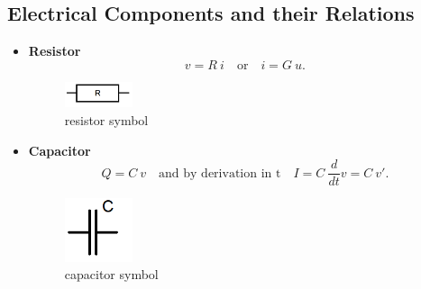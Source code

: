 	\subsection{Electrical Components and their Relations}
		
	\begin{frame}
		\begin{itemize}
			\item \textbf{Resistor} \newline
			\begin{equation}
				\label{eq:resistor law}
				v = R \ i \quad \text{or} \quad i = G \ u.
			\end{equation}
			\begin{figure}[H]
				\label{fig:resistor symbol}
				\centering
				\includegraphics[width=2cm]{../Tex/pictures/resistor.png}
				\caption{resistor symbol}
			\end{figure}
			
			\item \textbf{Capacitor} \newline
			\begin{equation}
				\label{eq:capacitor law}
				Q = C \ v \quad \text{and by derivation in t} \quad I = C \ \frac{d}{dt}v = C \ v'.
			\end{equation}
			\begin{figure}[H]
				\label{fig:capacitor symbol}
				\centering
				\includegraphics[width=2cm]{../Tex/pictures/capacitor.png}
				\caption{capacitor symbol}
			\end{figure}
		\end{itemize}
	\end{frame}
			
